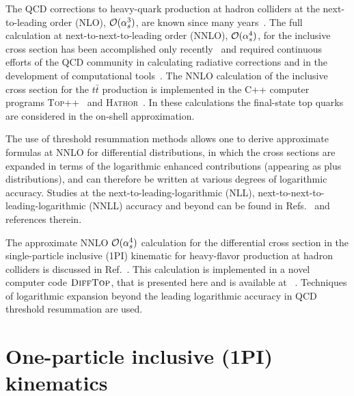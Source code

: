 \documentclass[11pt]{article}
\begin{document}
The QCD corrections to heavy-quark production at hadron colliders at the next-to-leading order 
(NLO), ${\cal O}(\alpha_s^3)$, are known since many years~\cite{Nason:1987xz,Nason:1989zy,Beenakker:1988bq,Meng:1989rp,Beenakker:1990maa,Mangano:1991jk}. 
The full calculation at next-to-next-to-leading order (NNLO), ${\cal O}(\alpha_s^4)$, 
for the inclusive cross section has been accomplished only recently~\cite{Czakon:2013goa,Czakon:2012pz,Czakon:2012zr,Baernreuther:2012ws} 
and required continuous efforts of the QCD community in calculating radiative corrections 
and in the development of computational tools~\cite{Czakon:2007wk,Czakon:2007ej,Mitov:2006xs,Ferroglia:2009ep,Ferroglia:2009ii,Czakon:2010td,Bierenbaum:2011gg,Baernreuther:2013caa}. The NNLO calculation of the inclusive cross section for the $t\bar{t}$ production is implemented 
in the \textsc{C++} computer programs \textsc{Top++}~\cite{Czakon:2011xx} and \textsc{Hathor}~\cite{Aliev:2010zk}.
In these calculations the final-state top quarks are considered in the on-shell approximation.

The use of threshold resummation methods allows one to derive approximate formulas 
at NNLO for differential distributions, in which the cross sections
are expanded in terms of the logarithmic enhanced contributions (appearing as plus distributions), 
and can therefore be written at various degrees of logarithmic accuracy.
Studies at the next-to-leading-logarithmic (NLL), next-to-next-to-leading-logarithmic (NNLL) 
accuracy and beyond can be found in Refs.~\cite{Kidonakis:2014isa,Kidonakis:2000ui,Kidonakis:2001nj,Kidonakis:2003tx,Kidonakis:2003qe,Kidonakis:2005kz,Kidonakis:2008mu,Kidonakis:2010tc,Kidonakis:2010dk,Czakon:2009zw} and references therein.

The approximate NNLO ${\cal O}(\alpha_s^4)$ calculation for the 
differential cross section in the single-particle inclusive (1PI) kinematic for heavy-flavor 
production at hadron colliders is discussed in Ref.~\cite{Guzzi:2014wia}. 
This calculation is implemented in a novel computer code $\textsc{DiffTop}$, that is presented here 
and is available at~\cite{difftop_web} .
Techniques of logarithmic expansion beyond the leading 
logarithmic accuracy in QCD threshold resummation are used.









\section{One-particle inclusive (1PI) kinematics}\label{sec:one-part-incl}
\end{document}
